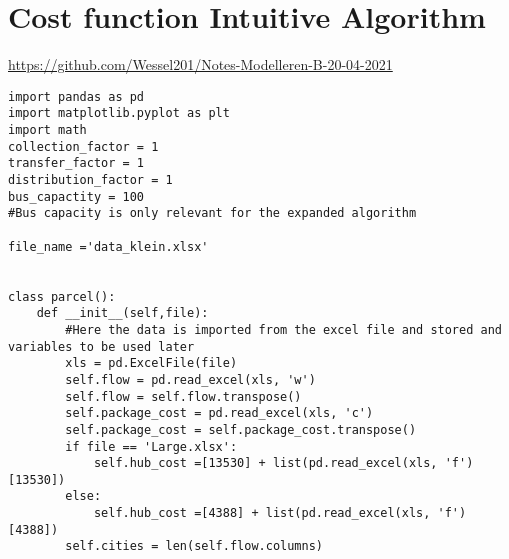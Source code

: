 \documentclass{article}
\begin{document}
\section{Cost function Intuitive Algorithm}
\url{https://github.com/Wessel201/Notes-Modelleren-B-20-04-2021}
\label{CostFunction}
\begin{verbatim}
import pandas as pd 
import matplotlib.pyplot as plt
import math
collection_factor = 1
transfer_factor = 1
distribution_factor = 1
bus_capactity = 100
#Bus capacity is only relevant for the expanded algorithm

file_name ='data_klein.xlsx'


class parcel():
    def __init__(self,file):
        #Here the data is imported from the excel file and stored and variables to be used later
        xls = pd.ExcelFile(file)
        self.flow = pd.read_excel(xls, 'w')
        self.flow = self.flow.transpose()
        self.package_cost = pd.read_excel(xls, 'c')
        self.package_cost = self.package_cost.transpose()
        if file == 'Large.xlsx':
            self.hub_cost =[13530] + list(pd.read_excel(xls, 'f')[13530])
        else:
            self.hub_cost =[4388] + list(pd.read_excel(xls, 'f')[4388])
        self.cities = len(self.flow.columns)


\end{verbatim}
\end{document}

